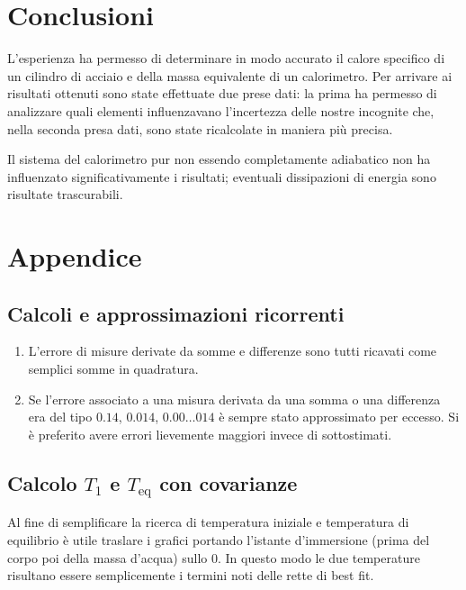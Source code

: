 \documentclass{article}
\begin{document}
	\section{Conclusioni}
	L'esperienza ha permesso di determinare in modo accurato il calore specifico di un cilindro di acciaio e della massa equivalente di un calorimetro. Per arrivare ai risultati ottenuti sono state effettuate due prese dati: la prima ha permesso di analizzare quali elementi influenzavano l'incertezza delle nostre incognite che, nella seconda presa dati, sono state ricalcolate in maniera più precisa.
	
	Il sistema del calorimetro pur non essendo completamente adiabatico non ha influenzato significativamente i risultati; eventuali dissipazioni di energia sono risultate trascurabili.
	
	\newpage
	\section{Appendice}
	\subsection{Calcoli e approssimazioni ricorrenti}
	\begin{enumerate}
		\item L'errore di misure derivate da somme e differenze sono tutti ricavati come semplici somme in quadratura.
		\item Se l'errore associato a una misura derivata da una somma o una differenza era del tipo \(0.14\), \(0.014\), \(0.00\dots 014\) è sempre stato approssimato per eccesso. Si è preferito avere errori lievemente maggiori invece di sottostimati.
	\end{enumerate}
	
	\subsection{Calcolo \(T_{1}\) e \(T_{\text{eq}}\) con covarianze} \label{covarianza}
	Al fine di semplificare la ricerca di temperatura iniziale e temperatura di equilibrio è utile traslare i grafici portando l'istante d'immersione (prima del corpo poi della massa d'acqua) sullo \(0\). In questo modo le due temperature risultano essere semplicemente i termini noti delle rette di best fit. \\
	
\end{document}
